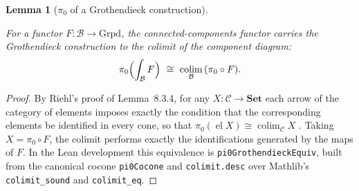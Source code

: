 \documentclass[11pt]{article}
\providecommand{\Grpd}{\mathrm{Grpd}}
\providecommand{\lean}[1]{}
\providecommand{\uses}[1]{}
\theoremstyle{plain}
\newtheorem{lemma}[theorem]{Lemma}
\theoremstyle{definition}
\theoremstyle{remark}
\begin{document}
\begin{lemma}[$\pi_0$ of a Grothendieck construction]\label{lem:pi0-grothendieck}
\lean{CategoryTheory.Grothendieck, pi0GrothendieckEquiv, pi0_grothendieck}
\uses{def:base}
For a functor $F:\mathcal B\to\Grpd$, the connected-components functor carries the Grothendieck
construction to the colimit of the component diagram:
\[
  \pi_0\Bigl(\int_{\mathcal B}F\Bigr)\ \cong\ \operatorname*{colim}_{\mathcal B}\,(\pi_0\circ F).
\]
\end{lemma}
\begin{proof}
By Riehl's proof of Lemma~8.3.4, for any $X:\mathcal C\to\mathbf{Set}$ each arrow of the
category of elements imposes exactly the condition that the corresponding elements be identified
in every cone, so that $\pi_0(\operatorname{el}X)\cong\operatorname{colim}_{\mathcal C}X$
\cite[p.~102]{Riehl}. Taking $X=\pi_0\circ F$, the colimit performs exactly the identifications
generated by the maps of $F$. In the Lean development this equivalence is
\texttt{pi0GrothendieckEquiv}, built from the canonical cocone \texttt{pi0Cocone} and
\texttt{colimit.desc} over Mathlib's \texttt{colimit\_sound} and \texttt{colimit\_eq}.
\end{proof}
\end{document}
